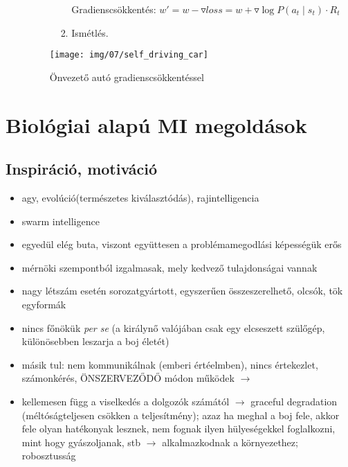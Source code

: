 \documentclass[a4paper, 11pt]{article}
\begin{document}
\begin{enumerate}
\begin{itemize}
\begin{itemize}
\begin{enumerate}
\begin{footnotesize}
					Gradienscsökkentés: $w' = w - \triangledown loss = w + \triangledown \log P(a_t \mid s_t) \cdot R_t$
				\end{footnotesize}
				
				\item Ismétlés.
			\end{enumerate}
		\end{itemize}
	\end{itemize}
	
	\begin{figure}[h!]
		\centering
		\texttt{[image: img/07/self\_driving\_car]}
		\caption{Önvezető autó gradienscsökkentéssel}
	\end{figure}
	
\end{enumerate}

\pagebreak


\section{Biológiai alapú MI megoldások}

\subsection{Inspiráció, motiváció}

\begin{itemize}
	\item agy, evolúció(természetes kiválasztódás), rajintelligencia
	\item swarm intelligence
	\item egyedül elég buta, viszont együttesen a problémamegodlási képességük erős
	\item mérnöki szempontból izgalmasak, mely kedvező tulajdonságai vannak
	\item nagy létszám esetén sorozatgyártott, egyszerűen összeszerelhető, olcsók, tök egyformák
	\item nincs főnökük \textit{per se} (a királynő valójában csak egy elcseszett szülőgép, különösebben leszarja a boj életét)
	\item másik tul: nem kommunikálnak (emberi értéelmben), nincs értekezlet, számonkérés, ÖNSZERVEZŐDŐ módon működek $\to$ 
	\item kellemesen függ a viselkedés a dolgozók számától $\to$ graceful degradation (méltóságteljesen csökken a teljesítmény); azaz ha meghal a boj fele, akkor fele olyan hatékonyak lesznek, nem fognak ilyen hülyeségekkel foglalkozni, mint hogy gyászoljanak, stb $\to$ alkalmazkodnak a környezethez; robosztusság
\end{itemize}
\end{document}

